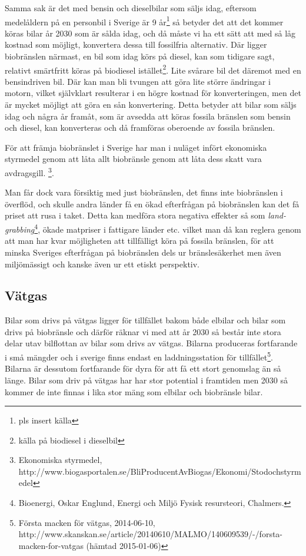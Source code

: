 \documentclass[a4paper,11pt,fleqn, titlepage]{article}
\begin{document}
Samma sak är det med bensin och dieselbilar som säljs idag, eftersom
medelåldern på en personbil i Sverige är 9 år\footnote{pls insert
källa} så betyder det att det kommer köras bilar år 2030 som är sålda idag,
och då måste vi ha ett sätt att med så låg kostnad som möjligt, konvertera
dessa till fossilfria alternativ. Där ligger biobränslen närmast, en bil
som idag körs på diesel, kan som tidigare sagt, relativt smärtfritt köras
på biodiesel istället\footnote{källa på biodiesel i dieselbil}. Lite
svårare bil det däremot med en bensindriven bil. Där kan man bli tvungen
att göra lite större ändringar i motorn, vilket självklart resulterar i en
högre kostnad för konverteringen, men det är mycket möjligt att göra en sån
konvertering. Detta betyder att bilar som säljs idag och några år framåt,
som är avsedda att köras fossila bränslen som bensin och diesel, kan
konverteras och då framföras oberoende av fossila bränslen.

För att främja biobränslet i Sverige har man i nuläget infört ekonomiska styrmedel 
genom att låta allt biobränsle genom att låta dess skatt vara
avdragsgill.
\footnote{Ekonomiska styrmedel, \\
http://www.biogasportalen.se/BliProducentAvBiogas/Ekonomi/Stodochstyrmedel}.

Man får dock vara försiktig med just biobränslen, det finns inte
biobränslen i överflöd, och skulle andra länder få en ökad efterfrågan på
biobränslen kan det få priset att rusa i taket. Detta kan medföra stora
negativa effekter så som \emph{land-grabbing}\footnote{Bioenergi, Oskar
Englund, Energi och Miljö Fysisk resursteori, Chalmers.}, ökade matpriser i
fattigare länder etc. vilket man då kan reglera genom att man har kvar
möjligheten att tillfälligt köra på fossila bränslen, för att minska
Sveriges efterfrågan på biobränslen dels ur bränslesäkerhet men även
miljömässigt och kanske även ur ett etiskt perspektiv.

\subsection{Vätgas}
Bilar som drivs på vätgas ligger för tillfället bakom både elbilar och bilar som drivs på biobränsle och därför räknar vi med att år 2030 så består inte stora delar utav bilflottan av bilar som drivs av vätgas. Bilarna produceras fortfarande i små mängder och i sverige finns endast en laddningsstation för tillfället\footnote{Första macken för vätgas, 2014-06-10, \\
http://www.skanskan.se/article/20140610/MALMO/140609539/-/forsta-macken-for-vatgas (hämtad 2015-01-06)}.
Bilarna är dessutom fortfarande för dyra för att få ett stort genomslag än så länge. Bilar som driv på vätgas har har stor potential i framtiden men 2030 så kommer de inte finnas i lika stor mäng som elbilar och biobränsle bilar.
\end{document}
